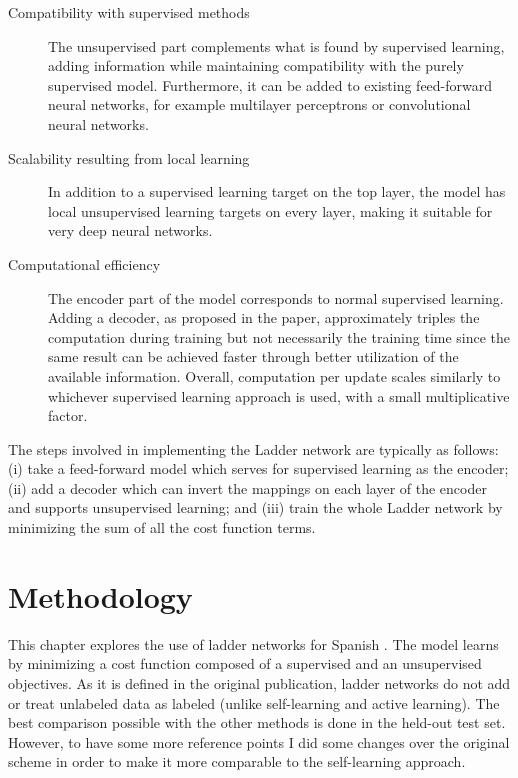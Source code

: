 \begin{description}
  \item[Compatibility with supervised methods] The unsupervised part complements
    what is found by supervised learning, adding information while maintaining
    compatibility with the purely supervised model. Furthermore, it can be added
    to existing feed-forward neural networks, for example multilayer perceptrons
    or convolutional neural networks.
  \item[Scalability resulting from local learning] In addition to a supervised
    learning target on the top layer, the model has local unsupervised learning
    targets on every layer, making it suitable for very deep neural networks.
  \item[Computational efficiency] The encoder part of the model corresponds to
    normal supervised learning. Adding a decoder, as proposed in the paper,
    approximately triples the computation during training but not necessarily
    the training time since the same result can be achieved faster through 
    better utilization of the available information. Overall, computation per
    update scales similarly to whichever supervised learning approach is used,
    with a small multiplicative factor.
\end{description}

The steps involved in implementing the Ladder network are typically as follows:
(i) take a feed-forward model which serves for supervised learning as the
encoder; (ii) add a decoder which can invert the mappings on each layer of the
encoder and supports unsupervised learning; and (iii) train the whole Ladder
network by minimizing the sum of all the cost function terms.

\section{Methodology}\label{sec:ladder:methodology}

This chapter explores the use of ladder networks for Spanish \vsd. The model
learns by minimizing a cost function composed of a supervised and an
unsupervised objectives. As it is defined in the original publication, ladder
networks do not add or treat unlabeled data as labeled (unlike self-learning
and active learning). The best comparison possible with the other methods is
done in the held-out test set. However, to have some more reference points I
did some changes over the original scheme in order to make it more comparable
to the self-learning approach.

